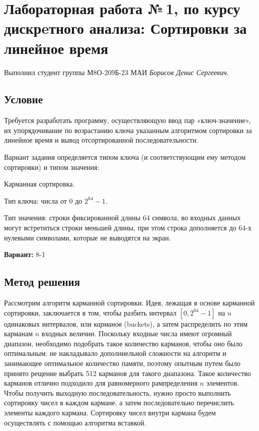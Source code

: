 \documentclass[12pt]{article}
\begin{document}
\section*{Лабораторная работа №\,1, по курсу дискрeтного анализа: Сортировки за линейное время}

Выполнил студент группы М8О-209Б-23 МАИ \textit{Борисов Денис Сергеевич}.

\subsection*{Условие}
Требуется разработать программу, осуществляющую ввод пар «ключ-значение», их упорядочивание по возрастанию ключа указанным алгоритмом сортировки за линейное время и вывод отсортированной последовательности.

Вариант задания определяется типом ключа (и соответствующим ему методом сортировки) и типом значения:

Карманная сортировка.

Тип ключа: числа от 0 до $2^{64} - 1$.

Тип значения: строки фиксированной длины 64 символа, во входных данных могут встретиться строки меньшей длины, при этом строка дополняется до 64-х нулевыми символами, которые не выводятся на экран.

\item \textbf{Вариант:} 8-1

\newpage
\subsection*{Метод решения}
Рассмотрим алгоритм карманной сортировки. Идея, лежащая в основе карманной сортировки, заключается в том, чтобы разбить интервал $[0, 2^{64} - 1]$ на $n$ одинаковых интервалов, или \textit{карманов} (buckets), а затем распределить по этим карманам $n$ входных величин. Поскольку входные числа имеют огромный диапазон, необходимо подобрать такое количество карманов, чтобы оно было оптимальным: не накладывало дополниельной сложности на алгоритм и занимающее оптимальное количество памяти, поэтому опытным путем было принято рещение выбрать 512 карманов для такого диапазона. Такое количество карманов отлично подходило для равномерного рампределения $n$ элементов. Чтобы получить выходную последовательность, нужно просто выполнить сортировку чисел в каждом кармане, а затем последовательно перечислить элементы каждого кармана. Сортировку чисел внутри кармана будем осуществлять с помощью алгоритма вставкой.
\end{document}
